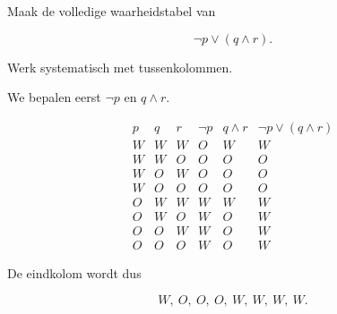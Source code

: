 \documentclass{ximera}
\begin{document}





\begin{oefening}{\oefG}

Maak de volledige waarheidstabel van

\[
\neg p\lor(q\land r).
\]

Werk systematisch met tussenkolommen.

\begin{oplossing}

We bepalen eerst $\neg p$ en $q\land r$.

\[
\begin{array}{c|c|c|c|c|c}
p&q&r&\neg p&q\land r&\neg p\lor(q\land r)\\
\hline
W&W&W&O&W&W\\
W&W&O&O&O&O\\
W&O&W&O&O&O\\
W&O&O&O&O&O\\
O&W&W&W&W&W\\
O&W&O&W&O&W\\
O&O&W&W&O&W\\
O&O&O&W&O&W
\end{array}
\]

De eindkolom wordt dus

\[
W,\ O,\ O,\ O,\ W,\ W,\ W,\ W.
\]

\end{oplossing}

\end{oefening}
\end{document}
